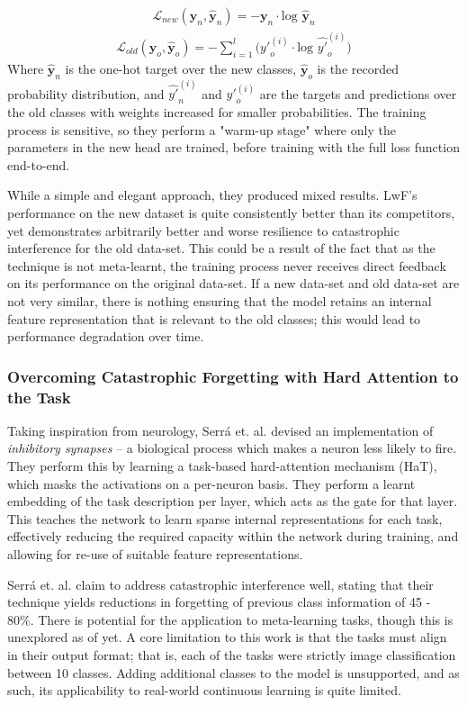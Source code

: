\documentclass{report}
\begin{document}
	\begin{align} \label{eqn:lwf:1}
	\mathcal{L}_{new}(\bm{y}_n,\hat{\bm{y}}_n) = -\bm{y}_n \cdot \text{log } \bm{\hat{y}}_n
	\end{align}
	\begin{align} \label{eqn:lwf:2}
	\mathcal{L}_{old}(\bm{y}_o,\hat{\bm{y}}_o) = -\sum_{i=1}^{l}\big( {y'}_{o}^{(i)} \cdot \text{log } \hat{y'}_o^{(i)}\big)
	\end{align}
	Where $\bm{\hat{y}}_n$ is the one-hot target over the new classes, $\bm{\hat{y}}_o$ is the recorded probability distribution, and $\hat{y'}_n^{(i)}$ and ${y'}_{o}^{(i)}$ are the targets and predictions over the old classes with weights increased for smaller probabilities. The training process is sensitive, so they perform a "warm-up stage" where only the parameters in the new head are trained, before training with the full loss function end-to-end. \par
	While a simple and elegant approach, they produced mixed results. LwF's performance on the new dataset is quite consistently better than its competitors, yet demonstrates arbitrarily better and worse resilience to catastrophic interference for the old data-set. This could be a result of the fact that as the technique is not meta-learnt, the training process never receives direct feedback on its performance on the original data-set. If a new data-set and old data-set are not very similar, there is nothing ensuring that the model retains an internal feature representation that is relevant to the old classes; this would lead to performance degradation over time. \par
	
	\subsubsection{Overcoming Catastrophic Forgetting with Hard Attention to the Task}
	Taking inspiration from neurology, Serr\'a et. al. \parencite{hat} devised an implementation of \emph{inhibitory synapses} -- a biological process which makes a neuron less likely to fire. They perform this by learning a task-based hard-attention mechanism (HaT), which masks the activations on a per-neuron basis. They perform a learnt embedding of the task description per layer, which acts as the gate for that layer. This teaches the network to learn sparse internal representations for each task, effectively reducing the required capacity within the network during training, and allowing for re-use of suitable feature representations. \par
	Serr\'a et. al. claim to address catastrophic interference well, stating that their technique yields reductions in forgetting of previous class information of 45 - 80\%. There is potential for the application to meta-learning tasks, though this is unexplored as of yet. A core limitation to this work is that the tasks must align in their output format; that is, each of the tasks were strictly image classification between 10 classes. Adding additional classes to the model is unsupported, and as such, its applicability to real-world continuous learning is quite limited. \par
	
\end{document}
